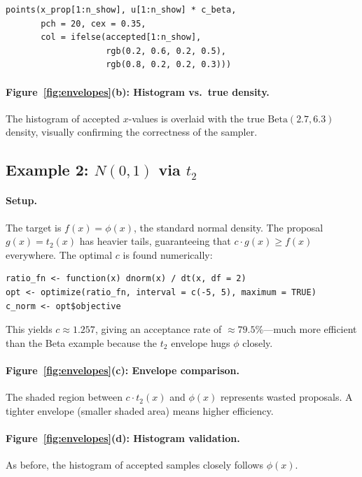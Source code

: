 \documentclass[11pt]{article}
\begin{document}
\begin{lstlisting}
points(x_prop[1:n_show], u[1:n_show] * c_beta,
       pch = 20, cex = 0.35,
       col = ifelse(accepted[1:n_show],
                    rgb(0.2, 0.6, 0.2, 0.5),
                    rgb(0.8, 0.2, 0.2, 0.3)))
\end{lstlisting}

\paragraph{Figure~\ref{fig:envelopes}(b): Histogram vs.\ true density.}
The histogram of accepted $x$-values is overlaid with the true $\mathrm{Beta}(2.7,6.3)$ density, visually confirming the correctness of the sampler.

\subsection{Example 2: $N(0,1)$ via $t_2$}

\paragraph{Setup.}
The target is $f(x) = \phi(x)$, the standard normal density.  The proposal $g(x) = t_2(x)$ has heavier tails, guaranteeing that $c\cdot g(x) \ge f(x)$ everywhere.  The optimal $c$ is found numerically:

\begin{lstlisting}
ratio_fn <- function(x) dnorm(x) / dt(x, df = 2)
opt <- optimize(ratio_fn, interval = c(-5, 5), maximum = TRUE)
c_norm <- opt$objective
\end{lstlisting}

This yields $c \approx 1.257$, giving an acceptance rate of $\approx 79.5\%$---much more efficient than the Beta example because the $t_2$ envelope hugs $\phi$ closely.

\paragraph{Figure~\ref{fig:envelopes}(c): Envelope comparison.}
The shaded region between $c \cdot t_2(x)$ and $\phi(x)$ represents wasted proposals.  A tighter envelope (smaller shaded area) means higher efficiency.

\paragraph{Figure~\ref{fig:envelopes}(d): Histogram validation.}
As before, the histogram of accepted samples closely follows $\phi(x)$.
\end{document}
